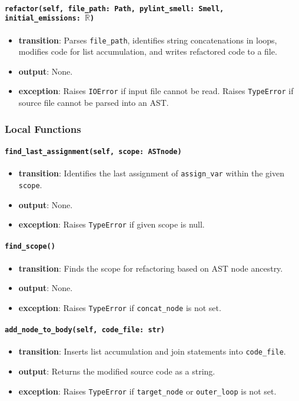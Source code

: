 \documentclass[12pt, titlepage]{article}
\begin{document}
\paragraph{\texttt{refactor(self, file\_path: Path, pylint\_smell: Smell, initial\_emissions: $\mathbb{R}$)}}
\begin{itemize}
  \item \textbf{transition}: Parses \texttt{file\_path}, identifies string concatenations in loops, modifies code for list accumulation, and writes refactored code to a file.
  \item \textbf{output}: None.
  \item \textbf{exception}: Raises \texttt{IOError} if input file cannot be read. Raises \texttt{TypeError} if source file cannot be parsed into an AST.
\end{itemize}

\subsubsection{Local Functions}
\paragraph{\texttt{find\_last\_assignment(self, scope: ASTnode)}}
\begin{itemize}
  \item \textbf{transition}: Identifies the last assignment of \texttt{assign\_var} within the given \texttt{scope}.
  \item \textbf{output}: None.
  \item \textbf{exception}: Raises \texttt{TypeError} if given scope is null.
\end{itemize}

\paragraph{\texttt{find\_scope()}}
\begin{itemize}
  \item \textbf{transition}: Finds the scope for refactoring based on AST node ancestry.
  \item \textbf{output}: None.
  \item \textbf{exception}: Raises \texttt{TypeError} if \texttt{concat\_node} is not set.
\end{itemize}

\paragraph{\texttt{add\_node\_to\_body(self, code\_file: str)}}
\begin{itemize}
  \item \textbf{transition}: Inserts list accumulation and join statements into \texttt{code\_file}.
  \item \textbf{output}: Returns the modified source code as a string.
  \item \textbf{exception}: Raises \texttt{TypeError} if \texttt{target\_node} or \texttt{outer\_loop} is not set.
\end{itemize}
  
\end{document}
